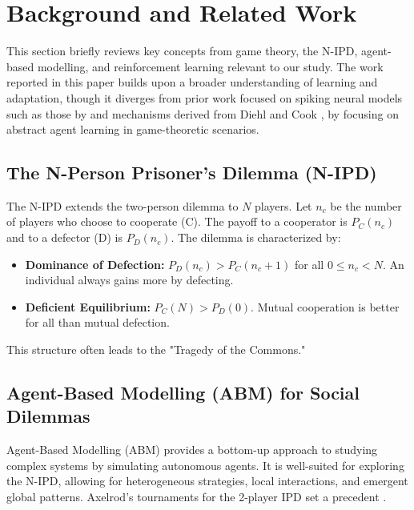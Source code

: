 \documentclass[]{llncs} %
\begin{document}
\section{Background and Related Work}
\label{sec:litreview}

This section briefly reviews key concepts from game theory, the N-IPD, agent-based modelling, and reinforcement learning relevant to our study.
The work reported in this paper builds upon a broader understanding of learning and adaptation, though it diverges from prior work focused on spiking neural models such as those by \cite{Huyck, Huyck-Samey, HuyckErekpaine} and mechanisms derived from Diehl and Cook \cite{Diehl}, by focusing on abstract agent learning in game-theoretic scenarios.

\subsection{The N-Person Prisoner's Dilemma (N-IPD)}
The N-IPD extends the two-person dilemma to $N$ players. %
Let $n_c$ be the number of players who choose to cooperate (C). The payoff to a cooperator is $P_C(n_c)$ and to a defector (D) is $P_D(n_c)$. The dilemma is characterized by:
\begin{itemize}
    \item \textbf{Dominance of Defection:} $P_D(n_c) > P_C(n_c+1)$ for all $0 \le n_c < N$. An individual always gains more by defecting.
    \item \textbf{Deficient Equilibrium:} $P_C(N) > P_D(0)$. Mutual cooperation is better for all than mutual defection.
\end{itemize}
This structure often leads to the "Tragedy of the Commons." %

\subsection{Agent-Based Modelling (ABM) for Social Dilemmas}
Agent-Based Modelling (ABM) provides a bottom-up approach to studying complex systems by simulating autonomous agents. %
It is well-suited for exploring the N-IPD, allowing for heterogeneous strategies, local interactions, and emergent global patterns. Axelrod's tournaments for the 2-player IPD set a precedent \cite{Axelrod}. %
\end{document}
